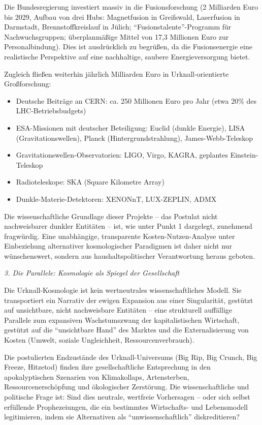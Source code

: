 \documentclass[11pt,a4paper]{letter}
\begin{document}
\begin{letter}
Die Bundesregierung investiert massiv in die Fusionsforschung (2 Milliarden Euro bis 2029, Aufbau von drei Hubs: Magnetfusion in Greifswald, Laserfusion in Darmstadt, Brennstoffkreislauf in Jülich; \enquote{Fusionstalente}-Programm für Nachwuchsgruppen; überplanmäßige Mittel von 17,3 Millionen Euro zur Personalbindung). Dies ist ausdrücklich zu begrüßen, da die Fusionsenergie eine realistische Perspektive auf eine nachhaltige, saubere Energieversorgung bietet.

Zugleich fließen weiterhin jährlich Milliarden Euro in Urknall-orientierte Großforschung:
\begin{itemize}
    \item Deutsche Beiträge an CERN: ca. 250 Millionen Euro pro Jahr (etwa 20\% des LHC-Betriebsbudgets)
    \item ESA-Missionen mit deutscher Beteiligung: Euclid (dunkle Energie), LISA (Gravitationswellen), Planck (Hintergrundstrahlung), James-Webb-Teleskop
    \item Gravitationswellen-Observatorien: LIGO, Virgo, KAGRA, geplantes Einstein-Teleskop
    \item Radioteleskope: SKA (Square Kilometre Array)
    \item Dunkle-Materie-Detektoren: XENONnT, LUX-ZEPLIN, ADMX
\end{itemize}

Die wissenschaftliche Grundlage dieser Projekte – das Postulat nicht nachweisbarer dunkler Entitäten – ist, wie unter Punkt 1 dargelegt, zunehmend fragwürdig. Eine unabhängige, transparente Kosten-Nutzen-Analyse unter Einbeziehung alternativer kosmologischer Paradigmen ist daher nicht nur wünschenswert, sondern aus haushaltspolitischer Verantwortung heraus geboten.

\vspace{0.2cm}

\noindent
\textit{3. Die Parallele: Kosmologie als Spiegel der Gesellschaft}

Die Urknall-Kosmologie ist kein wertneutrales wissenschaftliches Modell. Sie transportiert ein Narrativ der ewigen Expansion aus einer Singularität, gestützt auf unsichtbare, nicht nachweisbare Entitäten – eine strukturell auffällige Parallele zum expansiven Wachstumszwang der kapitalistischen Wirtschaft, gestützt auf die \enquote{unsichtbare Hand} des Marktes und die Externalisierung von Kosten (Umwelt, soziale Ungleichheit, Ressourcenverbrauch).

Die postulierten Endzustände des Urknall-Universums (Big Rip, Big Crunch, Big Freeze, Hitzetod) finden ihre gesellschaftliche Entsprechung in den apokalyptischen Szenarien von Klimakollaps, Artensterben, Ressourcenerschöpfung und ökologischer Zerstörung. Die wissenschaftliche und politische Frage ist: Sind dies neutrale, wertfreie Vorhersagen – oder sich selbst erfüllende Prophezeiungen, die ein bestimmtes Wirtschafts- und Lebensmodell legitimieren, indem sie Alternativen als \enquote{unwissenschaftlich} diskreditieren?


\end{letter}
\end{document}
